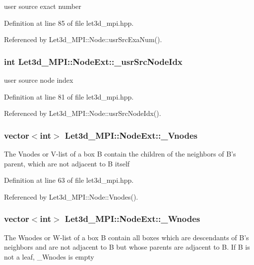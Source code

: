 user source exact number 

Definition at line 85 of file let3d\_\-mpi.hpp.

Referenced by Let3d\_\-MPI::Node::usr\-Src\-Exa\-Num().
\subsubsection{\setlength{\rightskip}{0pt plus 5cm}int {\bf Let3d\_\-MPI::Node\-Ext::\_\-usr\-Src\-Node\-Idx}}\label{classLet3d__MPI_1_1NodeExt_f8dac9976a76b057b87438631e877aa1_f8dac9976a76b057b87438631e877aa1}


user source node index 

Definition at line 81 of file let3d\_\-mpi.hpp.

Referenced by Let3d\_\-MPI::Node::usr\-Src\-Node\-Idx().
\subsubsection{\setlength{\rightskip}{0pt plus 5cm}vector$<$int$>$ {\bf Let3d\_\-MPI::Node\-Ext::\_\-Vnodes}}\label{classLet3d__MPI_1_1NodeExt_76d043428c3dde9a2fc051b3b264dfce_76d043428c3dde9a2fc051b3b264dfce}


The Vnodes or V-list of a box B contain the children of the neighbors of B's parent, which are not adjacent to B itself 

Definition at line 63 of file let3d\_\-mpi.hpp.

Referenced by Let3d\_\-MPI::Node::Vnodes().
\subsubsection{\setlength{\rightskip}{0pt plus 5cm}vector$<$int$>$ {\bf Let3d\_\-MPI::Node\-Ext::\_\-Wnodes}}\label{classLet3d__MPI_1_1NodeExt_983b9481f8e54a74dbe36f633c4a8da7_983b9481f8e54a74dbe36f633c4a8da7}


The Wnodes or W-list of a box B contain all boxes which are descendants of B's neighbors and are not adjacent to B but whose parents are adjacent to B. If B is not a leaf, \_\-Wnodes is empty 

